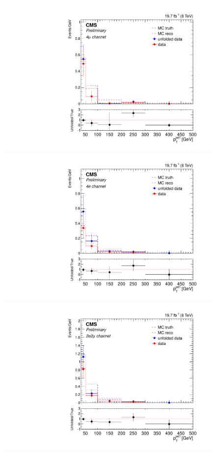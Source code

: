 \begin{figure}[hbtp]
  \begin{center}
    \includegraphics[width=\cmsFigWidth]{Figures/PtJet1_ZZTo4m_Mad_fr_binwidth}
    \includegraphics[width=\cmsFigWidth]{Figures/PtJet1_ZZTo4e_Mad_fr_binwidth}
    \includegraphics[width=\cmsFigWidth]{Figures/PtJet1_ZZTo2e2m_Mad_fr_binwidth}  

\end{center}
\end{figure}
